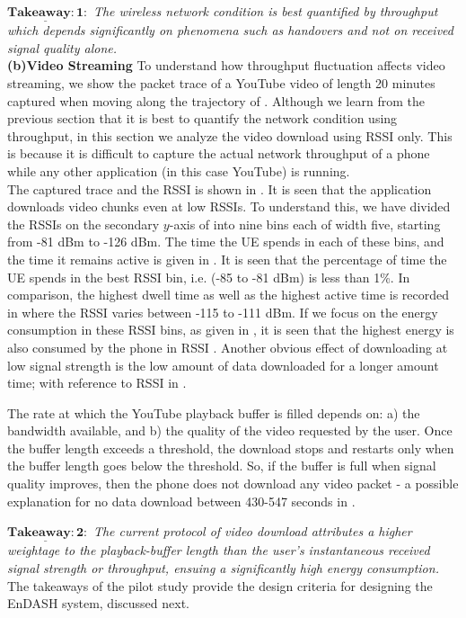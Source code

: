 $\mathrm{\mathbf{\underline{Takeaway:1}}}:$ \textit{The wireless network condition is best quantified by throughput which depends  significantly on phenomena such as handovers and not  on received signal quality alone.}\\
{\textbf{(b)Video Streaming}}\label{sec:chap03:vstreaming}
To understand how throughput fluctuation affects video streaming, 
we show the packet trace of a YouTube video of length 20 minutes captured when moving along the trajectory of \fig{\ref{fig:chap03:technology_with_traj}}.  Although we learn from the previous section that it is best to quantify the network condition using throughput, in this section we analyze the video download using \ac{RSSI} only. This is because it is difficult to capture the actual network throughput of a phone while any other application (in this case YouTube) is running.\\
\indent The  captured trace and the \ac{RSSI}  is shown in \fig{\ref{fig:chap03:pcap_RSSI}}. It is seen that the application downloads video chunks even at low \acp{RSSI}. To understand this, we have divided the \acp{RSSI} on the secondary $y$-axis of \fig{\ref{fig:chap03:pcap_RSSI}} into nine bins each of width five, starting from -81 dBm to -126 dBm. The time the \ac{UE} spends in each of these bins, and the time it remains active is given in \fig{\ref{fig:chap03:vid_time}}. It is seen that the percentage of time the \ac{UE} spends in the best \ac{RSSI} bin, i.e.  (-85 to -81 dBm) is less than 1\%. In comparison, the highest dwell time   as well as the highest active time is recorded in  where the \ac{RSSI} varies between -115 to -111 dBm. If we focus on the energy consumption in these \ac{RSSI} bins, as given in \fig{\ref{fig:chap03:vid_thpt}}, it is seen that the highest energy is also consumed by the phone in \ac{RSSI} . Another obvious effect of downloading at low signal strength is the low amount of data downloaded for a longer amount time; with reference to \ac{RSSI}  in \fig{\ref{fig:chap03:vid_thpt}}.


\indent The rate at which the YouTube playback buffer is filled depends on: a) the bandwidth available, and b) the quality of the video requested by the user. Once the buffer length exceeds a threshold, the download stops and restarts only when the buffer length goes below the threshold. So, if the buffer is full when signal quality improves, then the phone does not download any video packet - a possible explanation for no data download between  430-547 seconds in \fig{ \ref{fig:chap03:pcap_RSSI}}.


$\mathrm{\mathbf{\underline{Takeaway:2}}}:$ \textit{The current protocol of  video download attributes a higher weightage to the playback-buffer length than the user's instantaneous received signal strength or throughput, ensuing a significantly high energy consumption.}\\
\indent The takeaways of the pilot study provide the design criteria for designing the EnDASH system, discussed next. 